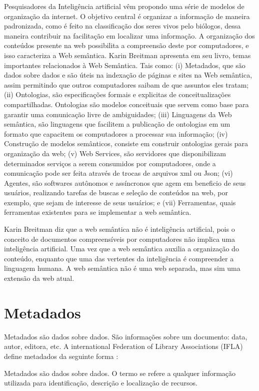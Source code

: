 Pesquisadores da Inteligência artificial vêm propondo uma série de modelos de organização da internet. O objetivo central é organizar a informação de maneira padronizada, como é feito na classificação dos seres vivos pelo biólogos, dessa maneira contribuir na facilitação em localizar uma informação. A organização dos conteúdos presente na web possibilita a compreensão deste por computadores, e isso caracteriza a Web semântica. Karin Breitman apresenta em seu livro, temas importantes relacionados à Web Semântica. Tais como: (i) Metadados, que são dados sobre dados e são úteis na indexação de páginas e sites na Web semântica, assim permitindo que outros computadores saibam de que assuntos eles tratam; (ii) Ontologias, são especificações formais e explicitas de conceitualizações compartilhadas. Ontologias são modelos conceituais que servem como base para garantir uma comunicação livre de ambiguidades; (iii) Linguagens da Web semântica, são linguagens que facilitem a publicação de ontologias em um formato que capacitem os computadores a processar sua informação; (iv) Construção de modelos semânticos, consiste em construir ontologias gerais para organização da web; (v) Web Services, são servidores que disponibilizam determinados serviços a serem consumidos por computadores, onde a comunicação pode ser feita através de trocas de arquivos xml ou Json; (vi) Agentes, são softwares autônomos e assíncronos que agem em beneficio de seus usuários, realizando tarefas de buscas e seleção de conteúdos na web, por exemplo, que sejam de interesse de seus usuários; e (vii) Ferramentas, quais ferramentas existentes para se implementar a web semântica.

Karin Breitman diz que a web semântica não é inteligência artificial, pois o conceito de documentos compreensíveis por computadores não implica uma inteligência artificial. Uma vez que a web semântica auxilia a organização do conteúdo, enquanto que uma das vertentes da  inteligência é compreender a linguagem humana. A web semântica não é uma web separada, mas sim uma extensão da web atual.

\section{Metadados}

Metadados são dados sobre dados. São informações sobre um documento: data, autor, editora, etc. A international Federation of Library Associations (IFLA) define metadados da seguinte forma : 
\begin{citacao}
 Metadados são dados sobre dados. O termo se refere a qualquer informação utilizada para identificação, descrição e localização de recursos.
\end{citacao}

